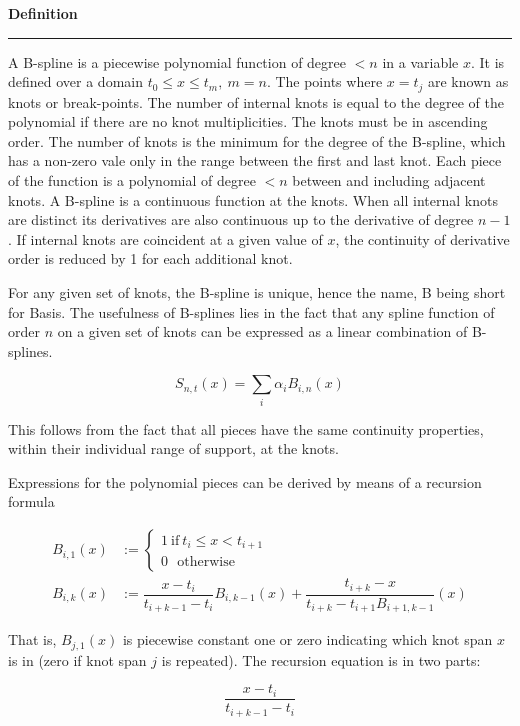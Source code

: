 \textbf{Definition}
\noindent\hrule
A B-spline is a piecewise polynomial function of degree $ <n $ in a variable $ x $. It is defined over a domain $ t_0 \le x \le t_m,~m=n $. The points where $ x = t_j $ are known as knots or break-points. The number of internal knots is equal to the degree of the polynomial if there are no knot multiplicities. The knots must be in ascending order. The number of knots is the minimum for the degree of the B-spline, which has a non-zero vale only in the range between the first and last knot. Each piece of the function is a polynomial of degree $ <n $ between and including adjacent knots. A B-spline is a continuous function at the knots. When all internal knots are distinct its derivatives are also continuous up to the derivative of degree $ n-1 $. If internal knots are coincident at a given value of $ x $, the continuity of derivative order is reduced by 1 for each additional knot.

For any given set of knots, the B-spline is unique, hence the name, B being short for Basis. The usefulness of B-splines lies in the fact that any spline function of order $ n $ on a given set of knots can be expressed as a linear combination of B-splines.

\begin{equation}
S_{n,t}(x) = \sum_{i} \alpha_i B_{i,n}(x)
\end{equation}

This follows from the fact that all pieces have the same continuity properties, within their individual range of support, at the knots.

Expressions for the polynomial pieces can be derived by means of a recursion formula

\begin{align}
B_{i,1}(x) &:= \begin{cases}
1~\mathrm{if}~t_i \le x < t_{i+1}\\
0~~~\mathrm{otherwise}
\end{cases}\\
B_{i,k}(x) &:= \dfrac{x-t_i}{t_{i+k-1}-t_i} B_{i,k-1} (x) + \dfrac{t_{i+k}-x}{t_{i+k}-t_{i+1} B_{i+1,k-1}}(x)
\end{align}

That is, $ B_{j,1}(x) $ is piecewise constant one or zero indicating which knot span $ x $ is in (zero if knot span $ j $ is repeated). The recursion equation is in two parts:

\begin{equation}
\dfrac{x-t_i}{t_{i+k-1} - t_i}
\end{equation}

